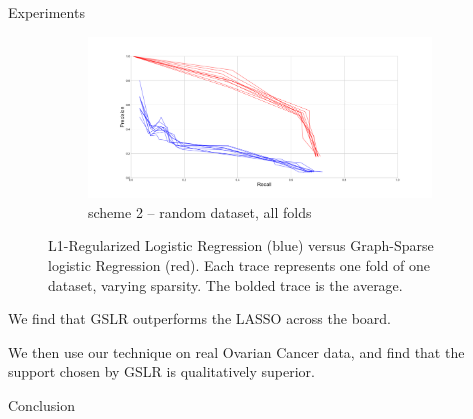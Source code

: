 \documentclass[svgnames,final]{beamer}
\begin{document}
\begin{frame}
\begin{columns}[T]
\begin{column}{.3\linewidth}
\begin{block}{Experiments}
\begin{figure}[h]
\begin{subfigure}{.5\textwidth}
		  \label{fig:sub3}
		\end{subfigure}%
		\begin{subfigure}{.5\textwidth}
		  \centering
		  \includegraphics[width=\linewidth]{images/3.pdf}
		  \caption{scheme 2 -- random dataset, all folds}
		  \label{fig:sub4}
		\end{subfigure}
		\caption{L1-Regularized Logistic Regression (blue) versus Graph-Sparse logistic Regression (red). Each trace represents one fold of one dataset, varying sparsity. The bolded trace is the average.}
		\label{fig:perf}
		\end{figure}

		We find that GSLR outperforms the LASSO across the board.

		We then use our technique on real Ovarian Cancer data, and find that the support chosen by GSLR is qualitatively superior.

	\end{block}

	\vspace{2cm}

	\begin{block}{Conclusion}



	\end{block}

\end{column}
\end{columns}
\end{frame}
\end{document}
